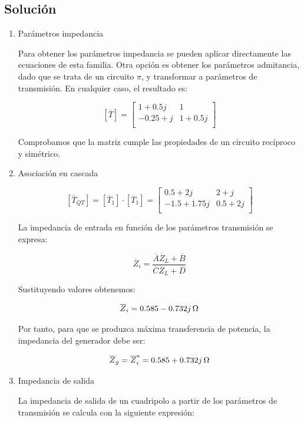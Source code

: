 \documentclass[12pt]{article}
\begin{document}
\clearpage 
\subsection*{Solución}

\begin{enumerate}
\item Parámetros impedancia

  Para obtener los parámetros impedancia se pueden aplicar
  directamente las ecuaciones de esta familia. Otra opción es obtener
  los parámetros admitancia, dado que se trata de un circuito $\pi$, y
  transformar a parámetros de transmisión. En cualquier caso, el
  resultado es:

\[
  [\overline{T}] = \left[
    \begin{array}{cc}
      1 + 0.5j & 1\\
      -0.25 + j & 1 + 0.5j\\
    \end{array}
  \right]
\]

Comprobamos que la matriz cumple las propiedades de un circuito
recíproco y simétrico.

 
\item Asociación en cascada

  \[
    [\overline{T}_{QT}] = [\overline{T}_1] \cdot [\overline{T}_1] = \left[
      \begin{array}{cc}
        0.5 + 2j & 2 + j\\
        -1.5 + 1.75j & 0.5 + 2j\\
      \end{array}
    \right]
  \]
  

  
  La impedancia de entrada en función de los parámetros transmisión se
  expresa:

\[
  \overline{Z}_i = \frac{\overline{A} \overline{Z}_L +
    \overline{B}}{\overline{C}\overline{Z}_L + \overline{D}}
\]

Sustituyendo valores obtenemos:

  \[
    \overline{Z}_{i} = \SI[parse-numbers=false]{0.585 - 0.732j}{\ohm}
  \]

  Por tanto, para que se produzca máxima transferencia de potencia, la
  impedancia del generador debe ser:

  \[
    \overline{Z}_{g} = \overline{Z}_{i}^* = \SI[parse-numbers=false]{0.585 + 0.732j}{\ohm}
  \]
\item Impedancia de salida

  La impedancia de salida de un cuadripolo a partir de los parámetros de transmisión se calcula con la siguiente expresión:


\end{enumerate}
\end{document}
